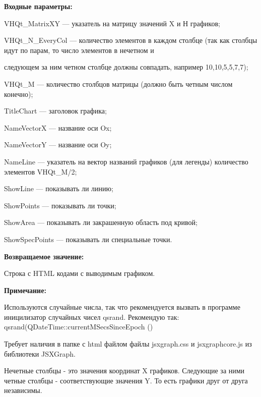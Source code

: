 \textbf{Входные параметры:}
 
VHQt\_MatrixXY --- указатель на матрицу значений X и Н графиков;
 
VHQt\_N\_EveryCol --- количество элементов в каждом столбце (так как столбцы идут по парам, то число элементов в нечетном и
 
следующем за ним четном столбце должны совпадать, например 10,10,5,5,7,7);
 
VHQt\_M --- количество столбцов матрицы (должно быть четным числом конечно);
 
TitleChart --- заголовок графика;
 
NameVectorX --- название оси Ox;
 
NameVectorY --- название оси Oy;
 
NameLine --- указатель на вектор названий графиков (для легенды) количество элементов VHQt\_M/2;
 
ShowLine --- показывать ли линию;
 
ShowPoints --- показывать ли точки;
 
ShowArea --- показывать ли закрашенную область под кривой;
 
ShowSpecPoints --- показывать ли специальные точки.

\textbf{Возвращаемое значение:}

Строка с HTML кодами с выводимым графиком.

\textbf{Примечание:}

Используются случайные числа, так что рекомендуется вызвать в программе иницилизатор случайных чисел qsrand. Рекомендую так: qsrand(QDateTime::currentMSecsSinceEpoch () %

Требует наличия в папке с html файлом файлы jsxgraph.css и jsxgraphcore.js из библиотеки JSXGraph.

Нечетные столбцы - это значения координат X графиков. Следующие за ними четные столбцы - соответствующие значения Y. То есть графики друг от друга независимы.